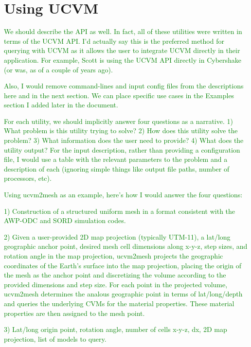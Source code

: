 
\section{Using UCVM}

\textcolor{green}{We should describe the API as well. In fact, all of these utilities were written in terms of the UCVM API. I'd actually say this is the preferred method for querying with UCVM as it allows the user to integrate UCVM directly in their application. For example, Scott is using the UCVM API directly in Cybershake (or was, as of a couple of years ago).}

\textcolor{green}{Also, I would remove command-lines and input config files from the descriptions here and in the next section. We can place specific use cases in the Examples section I added later in the document.}

\textcolor{green}{For each utility, we should implicitly answer four questions as a narrative. 1) What problem is this utility trying to solve? 2) How does this utility solve the problem? 3) What information does the user need to provide? 4) What does the utility output? For the input description, rather than providing a configuration file, I would use a table with the relevant parameters to the problem and a description of each (ignoring simple things like output file paths, number of processors, etc).}

\textcolor{green}{Using ucvm2mesh as an example, here's how I would answer the four questions:}

\textcolor{green}{1) Construction of a structured uniform mesh in a format consistent with the AWP-ODC and SORD simulation codes. }

\textcolor{green}{2) Given a user-provided 2D map projection (typically UTM-11), a lat/long geographic anchor point, desired mesh cell dimensions along x-y-z, step sizes, and rotation angle in the map projection, ucvm2mesh projects the geographic coordinates of the Earth's surface into the map projection, placing the origin of the mesh as the anchor point and discretizing the volume according to the provided dimensions and step size. For each point in the projected volume, ucvm2mesh determines the analous geographic point in terms of lat/long/depth and queries the underlying CVMs for the material properties. These material properties are then assigned to the mesh point. }

\textcolor{green}{3) Lat/long origin point, rotation angle, number of cells x-y-z, dx, 2D map projection, list of models to query. }

